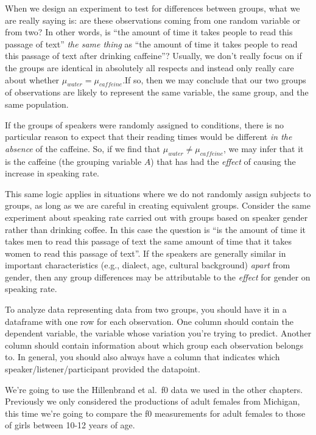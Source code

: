 \documentclass[
]{book}
\begin{document}
When we design an experiment to test for differences between groups, what we are really saying is: are these observations coming from one random variable or from two? In other words, is ``the amount of time it takes people to read this passage of text'' \emph{the same thing} as ``the amount of time it takes people to read this passage of text after drinking caffeine''? Usually, we don't really focus on if the groups are identical in absolutely all respects and instead only really care about whether \(\mu_{water} = \mu_{caffeine}\).If so, then we may conclude that our two groups of observations are likely to represent the same variable, the same group, and the same population.

If the groups of speakers were randomly assigned to conditions, there is no particular reason to expect that their reading times would be different \emph{in the absence} of the caffeine. So, if we find that \(\mu_{water} ≠ \mu_{caffeine}\), we may infer that it is the caffeine (the grouping variable \(A\)) that has had the \emph{effect} of causing the increase in speaking rate.

This same logic applies in situations where we do not randomly assign subjects to groups, as long as we are careful in creating equivalent groups. Consider the same experiment about speaking rate carried out with groups based on speaker gender rather than drinking coffee. In this case the question is ``is the amount of time it takes men to read this passage of text the same amount of time that it takes women to read this passage of text''. If the speakers are generally similar in important characteristics (e.g., dialect, age, cultural background) \emph{apart} from gender, then any group differences may be attributable to the \emph{effect} for gender on speaking rate.

To analyze data representing data from two groups, you should have it in a dataframe with one row for each observation. One column should contain the dependent variable, the variable whose variation you're trying to predict. Another column should contain information about which group each observation belongs to. In general, you should also always have a column that indicates which speaker/listener/participant provided the datapoint.

We're going to use the Hillenbrand et al.~f0 data we used in the other chapters. Previously we only considered the productions of adult females from Michigan, this time we're going to compare the f0 measurements for adult females to those of girls between 10-12 years of age.
\end{document}
